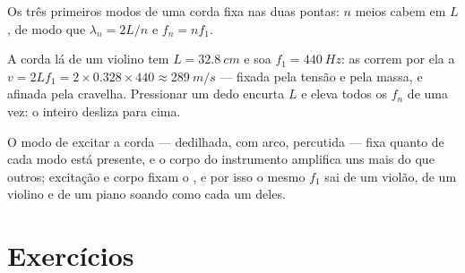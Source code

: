 \begin{omfigure}

{\small Os três primeiros modos de uma corda fixa nas duas pontas: $n$
meios  cabem em $L$, de modo que
$\lambda_n = 2L/n$ e $f_n = nf_1$.}
\end{omfigure}

\begin{example}\label{ex:g12:sound-acoustics:violin}
A corda lá de um violino tem $L = \qty{32.8}{cm}$ e soa
$f_1 = \qty{440}{Hz}$: as  correm por ela a
$v = 2Lf_1 = 2 \times 0.328 \times 440 \approx \qty{289}{m/s}$ ---
fixada pela tensão e pela massa, e afinada pela cravelha. Pressionar um
dedo encurta $L$ e eleva todos os $f_n$ de uma vez: o  inteiro
desliza para cima.
\end{example}

\begin{remark}\label{rem:g12:sound-acoustics:instruments}
O modo de excitar a corda --- dedilhada, com arco, percutida --- fixa
quanto de cada modo está presente, e o corpo do instrumento amplifica uns
 mais do que outros; excitação e corpo fixam o , e por
isso o mesmo $f_1$ sai de um violão, de um violino e de um piano soando
como cada um deles.
\end{remark}

\section{Exercícios}

